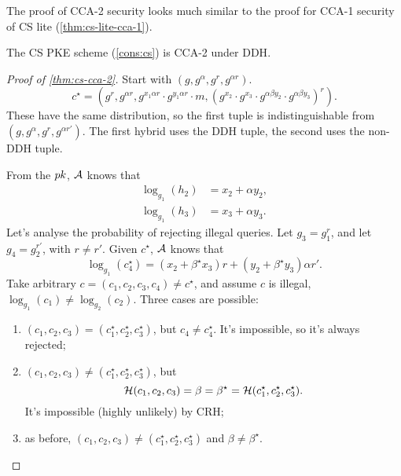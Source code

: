 The proof of \ac{CCA}-2 security looks much similar to the proof for \ac{CCA}-1 security of \ac{CS} lite (\cref{thm:cs-lite-cca-1}).

\begin{theorem} \label{thm:cs-cca-2}
	The \ac{CS} \ac{PKE} scheme (\cref{cons:cs}) is \ac{CCA}-2 under \ac{DDH}.
\end{theorem}

\begin{proof}[Proof of \cref{thm:cs-cca-2}]
	Start with $(g, g^{\alpha}, g^r, g^{\alpha r})$.
	\begin{equation*}
		c^{\star} = \left( g^r, g^{\alpha r}, g^{x_1 \alpha r} \cdot g^{y_1 \alpha r} \cdot m, \left(g^{x_2} \cdot g^{x_3} \cdot g^{\alpha \beta y_2} \cdot g^{\alpha \beta y_3}\right)^{r} \right).
	\end{equation*}
	These have the same distribution, so the first tuple is indistinguishable from $(g, g^{\alpha}, g^{r}, g^{\alpha r'})$.
	The first hybrid uses the \ac{DDH} tuple, the second uses the non-\ac{DDH} tuple.

	From the $pk$, $\mathcal{A}$ knows that
	\begin{align*}
		\log_{g_1} (h_2) & = x_2 + \alpha y_2, \\
		\log_{g_1} (h_3) & = x_3 + \alpha y_3.
	\end{align*}
	Let's analyse the probability of rejecting illegal queries.
	Let $g_3 = g_1^{r}$, and let $g_4 = g_2^{r'}$, with $r \neq r'$.
	Given $c^{\star}$, $\mathcal{A}$ knows that
	\begin{equation*}
		\log_{g_1} (c_4^{\star}) =
		(x_2 + \beta^{\star} x_3) r + (y_2 + \beta^{\star} y_3) \alpha r'.
	\end{equation*}
	Take arbitrary $c = (c_1, c_2, c_3, c_4) \neq c^{\star}$, and assume $c$ is illegal, \ie $\log_{g_1}(c_1) \neq \log_{g_2}(c_2)$.
	Three cases are possible:
	\begin{enumerate}
		\item $(c_1, c_2, c_3) = (c_1^{\star}, c_2^{\star}, c_3^{\star})$, but $c_4 \neq c_4^{\star}$.
			It's impossible, so it's always rejected;
		\item $(c_1, c_2, c_3) \neq (c_1^{\star}, c_2^{\star}, c_3^{\star})$, but
			\begin{equation*}
				\mathcal{H}(c_1, c_2, c_3) = \beta = \beta^{\star} = \mathcal{H}(c_1^{\star}, c_2^{\star}, c_3^{\star}).
			\end{equation*}
			It's impossible (highly unlikely) by \ac{CRH};
		\item as before, $(c_1, c_2, c_3) \neq (c_1^{\star}, c_2^{\star}, c_3^{\star})$ and $\beta \neq \beta^{\star}$. \qedhere
	\end{enumerate}
\end{proof}

